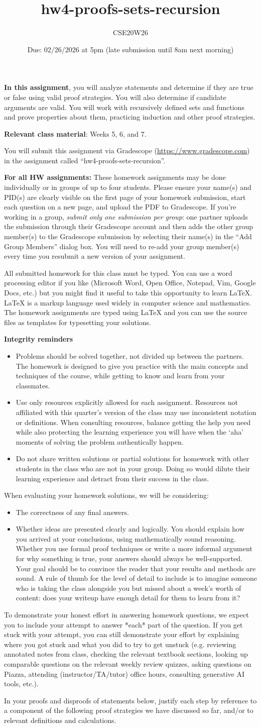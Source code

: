 \documentclass[12pt, oneside]{article}
\author{CSE20W26}
\title{hw4-proofs-sets-recursion}
\date{Due: 02/26/2026 at 5pm (late submission until 8am next morning)}
\newcommand{\instructions}{{\bf For all HW assignments:} 
These homework assignments may be done individually or in groups of up to four students.
Please ensure your name(s) and PID(s)
are clearly visible on the first page of your homework
submission, start each question on a new page, and upload the PDF to Gradescope.
If you're working in a group, {\it submit only one submission per group}: one partner uploads the
submission through their Gradescope account and then adds the other group member(s) to the Gradescope submission
by selecting their name(s) in the ``Add Group Members'' dialog box. You will need to re-add your group member(s)
every time you resubmit a new version of your assignment.

All submitted homework for this class must be typed. 
You can use a word processing editor if you like (Microsoft Word, Open Office, Notepad, Vim, Google Docs, etc.) 
but you might find it useful to take this opportunity to learn LaTeX. 
LaTeX is a markup language used widely in computer science and mathematics. 
The homework assignments are typed using LaTeX and you can use the source files 
as templates for typesetting your solutions.

{\bf Integrity reminders}
\begin{itemize}
\item Problems should be solved together, not divided up between the partners. The homework is
designed to give you practice with the main concepts and techniques of the course, 
while getting to know and learn from your classmates.
\item Use only resources explicitly allowed for each assignment. Resources not affiliated with this quarter's version of the class may use inconsistent notation or definitions. When consulting resources, balance
getting the help you need while also protecting the learning experience you will have when the `aha' moments of solving the problem authentically happen.
\item Do not share written solutions or partial solutions for homework with 
other students in the class who are not in your group. Doing so would dilute their learning 
experience and detract from their success in the class.
\end{itemize}

When evaluating your homework solutions, we will be considering:
\begin{itemize}
\item The correctness of any final answers.
\item Whether ideas are presented clearly and logically. You should explain how you arrived at your conclusions, using
mathematically sound reasoning. Whether you use formal proof techniques or 
write a more informal argument
for why something is true, your answers should always be well-supported. 
Your goal should be to convince the
reader that your results and methods are sound. A rule of thumb for the level of detail to include is to imagine someone who is taking the class alongside you but missed about a week's worth of content: does your writeup have enough detail for them to learn from it?
\end{itemize}
To demonstrate your honest effort in answering homework questions, we 
expect you to include your attempt to answer *each* part of the question. 
If you get stuck with your attempt, you can still demonstrate 
your effort by explaining where you got stuck and what 
you did to try to get unstuck (e.g. reviewing annotated notes from class, checking the relevant textbook sections, looking up comparable questions on the relevant weekly review quizzes, asking questions on Piazza, 
attending (instructor/TA/tutor) office hours, consulting generative AI tools, etc.). 
}
\begin{document}
\maketitle
\thispagestyle{fancy}


{\bf In this assignment}, you will analyze statements and determine if they are true or false using valid proof strategies.
You will also determine if candidate arguments are valid.
You will work with recursively defined sets and functions and prove 
properties about them, practicing induction and other proof strategies.


{\bf Relevant class material}: Weeks 5, 6, and 7.

You will submit this assignment via Gradescope
(\href{https://www.gradescope.com}{https://www.gradescope.com}) 
in the assignment called ``hw4-proofs-sets-recursion''.

\instructions

In your proofs and disproofs of statements below, justify each  step
by reference to  a component of the  following proof  strategies
we  have discussed so far, and/or to relevant definitions and calculations.

\vspace{-10pt}
\end{document}
